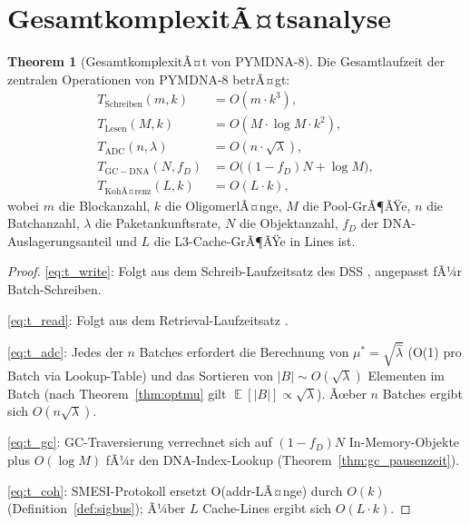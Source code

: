 ﻿\documentclass[a4paper,12pt]{article}
\theoremstyle{definition}
\newtheorem{theorem}{Theorem}[section]
\DeclareMathOperator{\E}{\mathbb{E}}
\begin{document}
\section{GesamtkomplexitÃ¤tsanalyse}

\begin{theorem}[GesamtkomplexitÃ¤t von PYMDNA-8]
  \label{thm:gesamtkomplexitaet}
  Die Gesamtlaufzeit der zentralen Operationen von PYMDNA-8 betrÃ¤gt:
  \begin{align}
    T_{\mathrm{Schreiben}}(m, k) &= O(m \cdot k^3), \label{eq:t_write} \\
    T_{\mathrm{Lesen}}(M, k)     &= O(M \cdot \log M \cdot k^2), \label{eq:t_read} \\
    T_{\mathrm{ADC}}(n, \lambda) &= O(n \cdot \sqrt{\lambda}), \label{eq:t_adc} \\
    T_{\mathrm{GC-DNA}}(N, f_D)  &= O\bigl((1-f_D) N + \log M\bigr), \label{eq:t_gc} \\
    T_{\mathrm{KohÃ¤renz}}(L, k)  &= O(L \cdot k), \label{eq:t_coh}
  \end{align}
  wobei $m$ die Blockanzahl, $k$ die OligomerlÃ¤nge, $M$ die Pool-GrÃ¶ÃŸe,
  $n$ die Batchanzahl, $\lambda$ die Paketankunftsrate, $N$ die Objektanzahl,
  $f_D$ der DNA-Auslagerungsanteil und $L$ die L3-Cache-GrÃ¶ÃŸe in Lines ist.
\end{theorem}

\begin{proof}
  \eqref{eq:t_write}: Folgt aus dem Schreib-Laufzeitsatz des DSS
  \cite[Satz~5.2]{epp2026dnastor}, angepasst fÃ¼r Batch-Schreiben.

  \eqref{eq:t_read}: Folgt aus dem Retrieval-Laufzeitsatz \cite[Satz~6.4]{epp2026dnastor}.

  \eqref{eq:t_adc}: Jedes der $n$ Batches erfordert die Berechnung von
  $\mu^* = \sqrt{\hat\lambda}$ (O(1) pro Batch via Lookup-Table)
  und das Sortieren von $|B| \sim O(\sqrt{\lambda})$ Elementen im
  Batch (nach Theorem~\ref{thm:optmu} gilt $\E[|B|] \propto \sqrt{\lambda}$).
  Ãœber $n$ Batches ergibt sich $O(n \sqrt{\lambda})$.

  \eqref{eq:t_gc}: GC-Traversierung verrechnet sich auf
  $(1-f_D) N$ In-Memory-Objekte plus $O(\log M)$ fÃ¼r den DNA-Index-Lookup
  (Theorem~\ref{thm:gc_pausenzeit}).

  \eqref{eq:t_coh}: SMESI-Protokoll ersetzt O(addr-LÃ¤nge) durch $O(k)$
  (Definition~\ref{def:sigbus}); Ã¼ber $L$ Cache-Lines ergibt sich $O(L \cdot k)$.
\end{proof}
\end{document}

